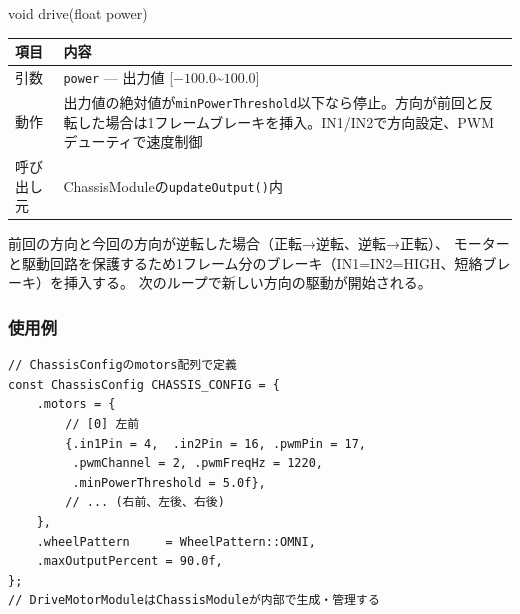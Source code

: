 \begin{funcblock}{void drive(float power)}
\begin{tabularx}{\textwidth}{l X}
\toprule
\textbf{項目} & \textbf{内容} \\
\midrule
引数       & \texttt{power} --- 出力値 [$-100.0$\textasciitilde$100.0$] \\
動作       & 出力値の絶対値が\texttt{minPowerThreshold}以下なら停止。方向が前回と反転した場合は1フレームブレーキを挿入。IN1/IN2で方向設定、PWMデューティで速度制御 \\
呼び出し元 & ChassisModuleの\texttt{updateOutput()}内 \\
\bottomrule
\end{tabularx}
\end{funcblock}

\begin{notebox}[方向反転時のブレーキ]
前回の方向と今回の方向が逆転した場合（正転→逆転、逆転→正転）、
モーターと駆動回路を保護するため1フレーム分のブレーキ（IN1=IN2=HIGH、短絡ブレーキ）を挿入する。
次のループで新しい方向の駆動が開始される。
\end{notebox}

\subsubsection{使用例}

\begin{lstlisting}[style=cppstyle, caption={DriveMotorModuleの使用例（ChassisModule内部）}]
// ChassisConfigのmotors配列で定義
const ChassisConfig CHASSIS_CONFIG = {
    .motors = {
        // [0] 左前
        {.in1Pin = 4,  .in2Pin = 16, .pwmPin = 17,
         .pwmChannel = 2, .pwmFreqHz = 1220,
         .minPowerThreshold = 5.0f},
        // ... (右前、左後、右後)
    },
    .wheelPattern     = WheelPattern::OMNI,
    .maxOutputPercent = 90.0f,
};
// DriveMotorModuleはChassisModuleが内部で生成・管理する
\end{lstlisting}
